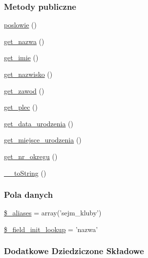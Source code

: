 \subsubsection*{Metody publiczne}
\begin{DoxyCompactItemize}
\item 
\hyperlink{classep___sejm___klub_a0f86bc9d504d1c4a3a60c1585cb85f97}{poslowie} ()
\item 
\hyperlink{classep___sejm___klub_ac0818f0049d7b84f08f77128f54cee36}{get\-\_\-nazwa} ()
\item 
\hyperlink{classep___sejm___klub_ac4b0c85dc2a130038f2d118dbd0c3d77}{get\-\_\-imie} ()
\item 
\hyperlink{classep___sejm___klub_abdd1d7ff92508da7f748ba1feec97af0}{get\-\_\-nazwisko} ()
\item 
\hyperlink{classep___sejm___klub_af80ca8310b60004454dd02a387deaa2c}{get\-\_\-zawod} ()
\item 
\hyperlink{classep___sejm___klub_ac7f9af5c3fa024e4c26a7b6bd4ce4bb4}{get\-\_\-plec} ()
\item 
\hyperlink{classep___sejm___klub_a880b240cd2d8c336fd1709bf0cb1ae2c}{get\-\_\-data\-\_\-urodzenia} ()
\item 
\hyperlink{classep___sejm___klub_ac57c08ec5e394a19c5bd9280c8376182}{get\-\_\-miejsce\-\_\-urodzenia} ()
\item 
\hyperlink{classep___sejm___klub_a2645a9f0aa5b0ccc482943348c033d0a}{get\-\_\-nr\-\_\-okregu} ()
\item 
\hyperlink{classep___sejm___klub_a7516ca30af0db3cdbf9a7739b48ce91d}{\-\_\-\-\_\-to\-String} ()
\end{DoxyCompactItemize}
\subsubsection*{Pola danych}
\begin{DoxyCompactItemize}
\item 
\hyperlink{classep___sejm___klub_ab4e31d75f0bc5d512456911e5d01366b}{\$\-\_\-aliases} = array('sejm\-\_\-kluby')
\item 
\hyperlink{classep___sejm___klub_a4a4d54ae35428077a7c61ec8a5139af3}{\$\-\_\-field\-\_\-init\-\_\-lookup} = 'nazwa'
\end{DoxyCompactItemize}
\subsubsection*{Dodatkowe Dziedziczone Składowe}


